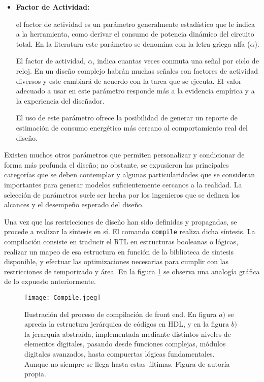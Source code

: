 \begin{itemize}
\item \textbf{Factor de Actividad:} {el factor de actividad es un parámetro generalmente estadístico que le indica a la herramienta, como derivar el consumo de potencia dinámico del circuito total. En la literatura este parámetro se denomina con la letra griega alfa (\textbf{$\alpha$}).

El factor de actividad, $\alpha$, indica cuantas veces conmuta una señal por ciclo de reloj. En un diseño complejo habrán muchas señales con factores de actividad diversos y este cambiará de acuerdo con la tarea que se ejecuta. El valor adecuado a usar en este parámetro responde más a la evidencia empírica y a la experiencia del diseñador.\cite{book:weste2005}

El uso de este parámetro ofrece la posibilidad de generar un reporte de estimación de consumo energético más cercano al comportamiento real del diseño.}
\end{itemize}

Existen muchos otros parámetros que permiten personalizar y condicionar de forma más profunda el diseño; no obstante, se expusieron las principales categorías que se deben contemplar y algunas particularidades que se consideran importantes para generar modelos suficientemente cercanos a la realidad. La selección de parámetros suele ser hecha por los ingenieros que se definen los alcances y el desempeño esperado del diseño.

Una vez que las restricciones de diseño han sido definidas y propagadas, se procede a realizar la síntesis en sí. El comando \texttt{compile} realiza dicha síntesis.
La compilación consiste en traducir el RTL en estructuras booleanas o lógicas, realizar un mapeo de esa estructura en función de la biblioteca de síntesis disponible, y efectuar las optimizaciones necesarias para cumplir con las restricciones de temporizado y área. En la figura \ref{comp} se observa una analogía gráfica de lo expuesto anteriormente.


\begin{figure}[h]
\texttt{[image: Compile.jpeg]}
\centering
\caption{Ilustración del proceso de compilación de front end. En figura \textbf{$a)$} se aprecia la estructura jerárquica de códigos en HDL, y en la figura \textbf{$b)$} la jerarquía abstraída, implementada mediante distintos niveles de elementos digitales, pasando desde funciones complejas, módulos digitales avanzados, hasta compuertas lógicas fundamentales. Aunque no siempre se llega hasta estas últimas. Figura de autoría propia.}
\label{comp}
\end{figure}


